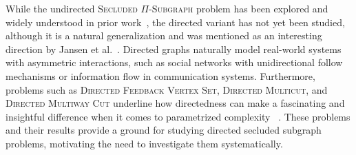 

While the undirected \textsc{Secluded $\Pi$-Subgraph} problem has been explored and widely understood in prior work~\cite{jansen2023single,golovach2020finding,donkers2023finding}, the directed variant has not yet been studied, although it is a natural generalization and was mentioned as an interesting direction by Jansen et al.~\cite{jansen2023single}. Directed graphs naturally model real-world systems with asymmetric interactions, such as social networks with unidirectional follow mechanisms or information flow in communication systems. Furthermore, problems such as \textsc{Directed Feedback Vertex Set}, \textsc{Directed Multicut}, and \textsc{Directed Multiway Cut} underline how directedness can make a fascinating and insightful difference when it comes to parametrized complexity ~\cite{chen2008fixed,hatzel2023fixed,multicut4,chitnis2013fixed}. These problems and their results provide a ground for studying directed secluded subgraph problems, motivating the need to investigate them systematically.

